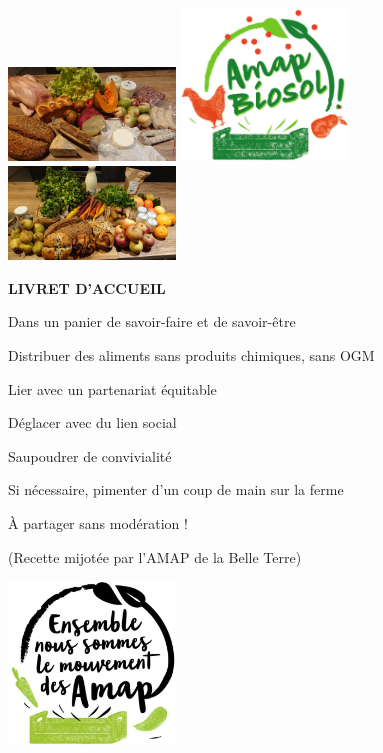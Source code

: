 \documentclass[8pt,a4paper,french]{article}
\begin{document}
\includegraphics[width=0.3333\textwidth]{Gauche.jpg}
\includegraphics[width=0.3333\textwidth]{Centre.jpg}
\includegraphics[width=0.3333\textwidth]{Droite.jpg}
\vspace{30ex}

\begin{center}
{\bf\color{ForestGreen} LIVRET D'ACCUEIL {\the\year{}}}
\vspace{1ex}

Dans un panier de savoir-faire et de savoir-être

Distribuer des aliments sans produits chimiques, sans OGM

Lier avec un partenariat équitable

Déglacer avec du lien social

Saupoudrer de convivialité

Si nécessaire, pimenter d'un coup de main sur la ferme

À partager sans modération !
\vspace{1ex}

{\small (Recette mijotée par l'AMAP de la Belle Terre)}
\vspace{30ex}

\includegraphics[width=0.3333\textwidth]{Ensemble.jpg}
\end{center}
\end{document}
